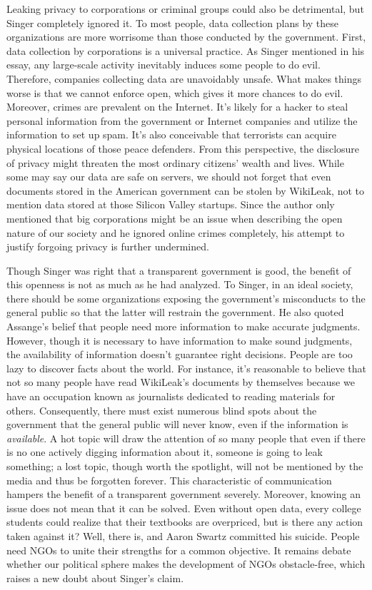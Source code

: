 \documentclass{writing}
\begin{document}
Leaking privacy to corporations or criminal groups could also be
detrimental, but Singer completely ignored it. To most people, data
collection plans by these organizations are more worrisome than those
conducted by the government. First, data collection by corporations is a
universal practice. As Singer mentioned in his essay, any large-scale
activity inevitably induces some people to do evil. Therefore, companies
collecting data are unavoidably unsafe. What makes things worse is that
we cannot enforce open, which gives it more chances to do evil.
Moreover, crimes are prevalent on the Internet. It's likely for a hacker
to steal personal information from the government or Internet companies
and utilize the information to set up spam. It's also conceivable that
terrorists can acquire physical locations of those peace defenders. From
this perspective, the disclosure of privacy might threaten the most
ordinary citizens' wealth and lives. While some may say our data are
safe on servers, we should not forget that even documents stored in the
American government can be stolen by WikiLeak, not to mention data
stored at those Silicon Valley startups. Since the author only mentioned
that big corporations might be an issue when describing the open nature
of our society and he ignored online crimes completely, his attempt to
justify forgoing privacy is further undermined.

Though Singer was right that a transparent government is good, the
benefit of this openness is not as much as he had analyzed. To Singer,
in an ideal society, there should be some organizations exposing the
government's misconducts to the general public so that the latter will
restrain the government. He also quoted Assange's belief that people
need more information to make accurate judgments. However, though it is
necessary to have information to make sound judgments, the availability
of information doesn't guarantee right decisions. People are too lazy to
discover facts about the world. For instance, it's reasonable to believe
that not so many people have read WikiLeak's documents by themselves
because we have an occupation known as journalists dedicated to reading
materials for others. Consequently, there must exist numerous blind
spots about the government that the general public will never know, even
if the information is \emph{available}. A hot topic will draw the
attention of so many people that even if there is no one actively
digging information about it, someone is going to leak something; a lost
topic, though worth the spotlight, will not be mentioned by the media
and thus be forgotten forever. This characteristic of communication
hampers the benefit of a transparent government severely. Moreover,
knowing an issue does not mean that it can be solved. Even without open
data, every college students could realize that their textbooks are
overpriced, but is there any action taken against it? Well, there is,
and Aaron Swartz committed his suicide. People need NGOs to unite their
strengths for a common objective. It remains debate whether our
political sphere makes the development of NGOs obstacle-free, which
raises a new doubt about Singer's claim.
\end{document}
